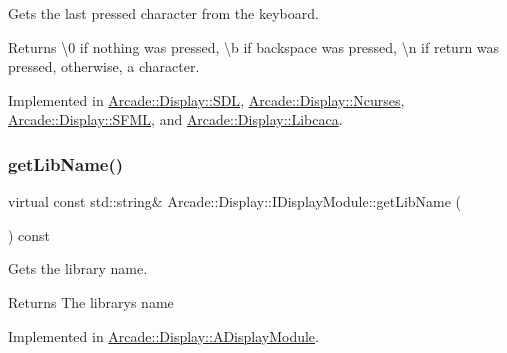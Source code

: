 Gets the last pressed character from the keyboard. 

\begin{DoxyReturn}{Returns}
\textbackslash{}0 if nothing was pressed, \textbackslash{}b if backspace was pressed, \textbackslash{}n if return was pressed, otherwise, a character. 
\end{DoxyReturn}


Implemented in \mbox{\hyperlink{classArcade_1_1Display_1_1SDL_a3ba94b49b72c9e189f52af7b97f4ad91}{Arcade\+::\+Display\+::\+S\+DL}}, \mbox{\hyperlink{classArcade_1_1Display_1_1Ncurses_a250dbb0610f79a7524ba5a926be750b6}{Arcade\+::\+Display\+::\+Ncurses}}, \mbox{\hyperlink{classArcade_1_1Display_1_1SFML_ae2bf9e9c157a9f0ae8d1b60bd072e881}{Arcade\+::\+Display\+::\+S\+F\+ML}}, and \mbox{\hyperlink{classArcade_1_1Display_1_1Libcaca_a741fdec5c2e77cc7959e5f3444f8c8ac}{Arcade\+::\+Display\+::\+Libcaca}}.

\mbox{\label{classArcade_1_1Display_1_1IDisplayModule_a0d8e957815e94766bdefbd7a5043e81a}} 
\subsubsection{\texorpdfstring{getLibName()}{getLibName()}}
{\footnotesize\ttfamily virtual const std\+::string\& Arcade\+::\+Display\+::\+I\+Display\+Module\+::get\+Lib\+Name (\begin{DoxyParamCaption}{ }\end{DoxyParamCaption}) const\hspace{0.3cm}{\ttfamily [pure virtual]}}



Gets the library name. 

\begin{DoxyReturn}{Returns}
The library\textquotesingle{}s name 
\end{DoxyReturn}


Implemented in \mbox{\hyperlink{classArcade_1_1Display_1_1ADisplayModule_a0f7d98b279058994f41978b17bb14222}{Arcade\+::\+Display\+::\+A\+Display\+Module}}.

\mbox{\label{classArcade_1_1Display_1_1IDisplayModule_af871661ff84c21581cd7233ba6f27aa0}} 
